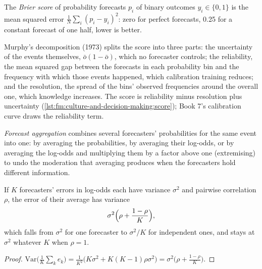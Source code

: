 \begin{definition}\label{def:fm:culture-and-decision-making:brier}
The \emph{Brier score} of probability forecasts $p_i$ of binary outcomes $y_i\in\{0,1\}$ is the mean squared error
$\frac1N\sum_i(p_i-y_i)^2$: zero for perfect forecasts, 0.25 for a constant forecast of one half, lower is better.
\end{definition}

Murphy's decomposition (1973) splits the score into three parts: the uncertainty of the events themselves, $\bar o(1-\bar o)$, which no forecaster
controls; the reliability, the mean squared gap between the forecasts in each probability bin and the frequency with which those events happened,
which calibration training reduces; and the resolution, the spread of the bins' observed frequencies around the overall one, which knowledge
increases. The score is reliability minus resolution plus uncertainty (\cref{lst:fm:culture-and-decision-making:score}); Book 7's calibration
curve draws the reliability term.

\label{lst:fm:culture-and-decision-making:score}

\begin{definition}\label{def:fm:culture-and-decision-making:agg}
\emph{Forecast aggregation} combines several forecasters' probabilities for the same event into one: by averaging the
probabilities, by averaging their log-odds, or by averaging the log-odds and multiplying them by a factor above one (extremising) to undo the
moderation that averaging produces when the forecasters hold different information.
\end{definition}

\begin{proposition}\label{prop:fm:culture-and-decision-making:rho}
If $K$ forecasters' errors in log-odds each have variance $\sigma^2$ and pairwise correlation $\rho$, the error of their average has variance
\[
\sigma^2\Bigl(\rho+\frac{1-\rho}{K}\Bigr),
\]
which falls from $\sigma^2$ for one forecaster to $\sigma^2/K$ for independent ones, and stays at $\sigma^2$ whatever $K$ when $\rho=1$.
\end{proposition}

\begin{proof}
$\mathrm{Var}\bigl(\frac1K\sum_ke_k\bigr)=\frac1{K^2}\bigl(K\sigma^2+K(K-1)\rho\sigma^2\bigr)=\sigma^2\bigl(\rho+\frac{1-\rho}K\bigr)$.
\end{proof}

